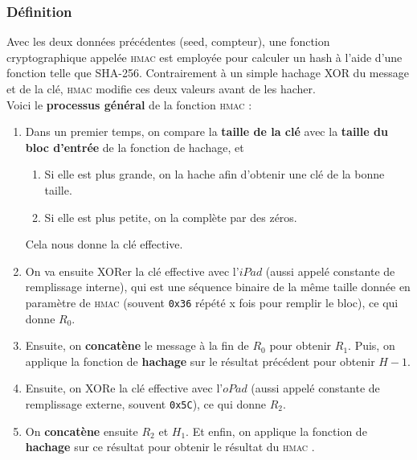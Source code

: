 \documentclass[a4paper, 10pt]{article}
\newcommand{\hmac}{\textsc{hmac} }
\begin{document}
        \subsubsection{Définition}

Avec les deux données précédentes (\textcolor{mygreen}{seed}, \textcolor{mygreen}{compteur}), une \textcolor{myblue}{fonction cryptographique} appelée \textcolor{myblue}{\hmac} est employée pour calculer un hash à l'aide d'une fonction telle que SHA-256.
Contrairement à un simple hachage XOR du message et de la clé, \hmac \textcolor{mygreen}{modifie ces deux valeurs avant de les hacher}.\\

\noindent
Voici le \textbf{processus général} de la fonction \hmac :

\begin{enumerate}
    \item Dans un premier temps, on compare la \textbf{taille de la clé} avec la \textbf{taille du bloc d'entrée} de la fonction de hachage, et
    \begin{enumerate}
        \item Si elle est plus grande, on la hache afin d'obtenir une clé de la bonne taille.
        \item Si elle est plus petite, on la complète par des zéros.
    \end{enumerate}
    Cela nous donne la clé effective.

    \item On va ensuite XORer la clé effective avec l'$iPad$ (aussi appelé \textcolor{myblue}{constante de remplissage interne}), qui est une séquence binaire de la même taille donnée en paramètre de \hmac (souvent \texttt{0x36} répété x fois pour remplir le bloc), ce qui donne $R_0$.

    \item Ensuite, on \textbf{concatène} le message à la fin de $R_0$ pour obtenir $R_1$. Puis, on applique la fonction de \textbf{hachage} sur le résultat précédent pour obtenir $H-1$.

    \item Ensuite, on XORe la clé effective avec l'$oPad$ (aussi appelé \textcolor{myblue}{constante de remplissage externe}, souvent \texttt{0x5C}), ce qui donne $R_2$.

    \item On \textbf{concatène} ensuite $R_2$ et $H_1$. Et enfin, on applique la fonction de \textbf{hachage} sur ce résultat pour obtenir le résultat du \hmac.
\end{enumerate}
\end{document}
